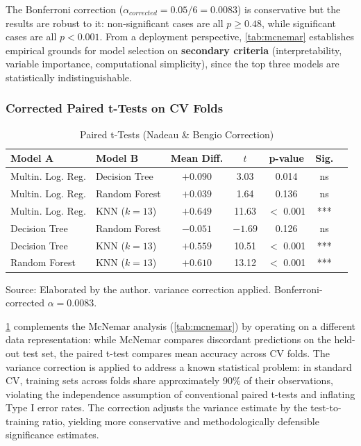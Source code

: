 \documentclass[alpha-refs,english]{RBCA_v3.0}
\begin{document}
The Bonferroni correction ($\alpha_{corrected} = 0.05/6 = 0.0083$) is 
conservative but the results are robust to it: non-significant cases are 
all $p \geq 0.48$, while significant cases are all $p < 0.001$. From a 
deployment perspective, \cref{tab:mcnemar} establishes empirical grounds 
for model selection on \textbf{secondary criteria} (interpretability, 
variable importance, computational simplicity), since the top three models 
are statistically indistinguishable.

\subsubsection{Corrected Paired t-Tests on CV Folds}

\begin{table}[h]
    \centering
    \begin{threeparttable}
    \caption{Paired t-Tests (Nadeau \& Bengio Correction)}
    \label{tab:ttests}
    \begin{tabular}{llccccc}
        \toprule
        Model A & Model B & Mean Diff. & $t$ & p-value & Sig. \\
        \midrule
        Multin. Log. Reg. & Decision Tree  & $+0.090$ & 3.03    & 0.014     & ns \\
        Multin. Log. Reg. & Random Forest  & $+0.039$ & 1.64    & 0.136     & ns \\
        Multin. Log. Reg. & KNN ($k=13$)   & $+0.649$ & 11.63   & $<$ 0.001 & *** \\
        Decision Tree     & Random Forest  & $-0.051$ & $-1.69$ & 0.126     & ns \\
        Decision Tree     & KNN ($k=13$)   & $+0.559$ & 10.51   & $<$ 0.001 & *** \\
        Random Forest     & KNN ($k=13$)   & $+0.610$ & 13.12   & $<$ 0.001 & *** \\
        \bottomrule
    \end{tabular}
    \begin{tablenotes}
        \footnotesize
        \item Source: Elaborated by the author. \cite{Nadeau2003} variance correction applied. Bonferroni-corrected $\alpha = 0.0083$.
    \end{tablenotes}
    \end{threeparttable}
\end{table}

\cref{tab:ttests} complements the McNemar analysis (\cref{tab:mcnemar}) by 
operating on a different data representation: while McNemar compares 
discordant predictions on the held-out test set, the paired t-test compares 
mean accuracy across CV folds. The \cite{Nadeau2003} variance correction is 
applied to address a known statistical problem: in standard CV, training 
sets across folds share approximately 90\% of their observations, violating 
the independence assumption of conventional paired t-tests and inflating 
Type I error rates. The correction adjusts the variance estimate by the 
test-to-training ratio, yielding more conservative and methodologically 
defensible significance estimates.
\end{document}
